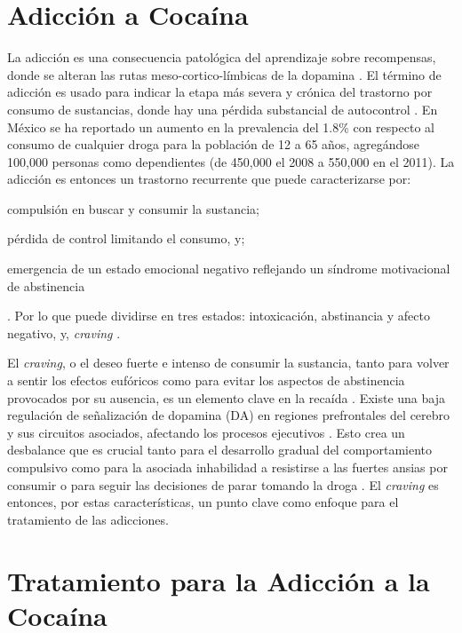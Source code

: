 \section{Adicción a Cocaína}

La adicción es una consecuencia patológica del aprendizaje sobre recompensas, donde se alteran las rutas meso-cortico-límbicas de la dopamina \parencite{Volkow2016}.
El término de adicción es usado para indicar la etapa más severa y crónica del trastorno por consumo de sustancias, donde hay una pérdida substancial de autocontrol \parencite{Volkow2016}.
En México se ha reportado un aumento en la prevalencia del 1.8\% con respecto al consumo de cualquier droga para la población de 12 a 65 años, agregándose 100,000 personas como dependientes (de 450,000 el 2008 a 550,000 en el 2011)\parencite{InstitutoNacionaldePsiquiatriaRamondelaFuenteMuniz2012a}.
La adicción es entonces un trastorno recurrente que puede caracterizarse por:
\begin{enumerate*}
    \item{compulsión en buscar y consumir la sustancia; }
    \item{pérdida de control limitando el consumo, y; }
    \item{emergencia de un estado emocional negativo reflejando un síndrome motivacional de abstinencia}
\end{enumerate*}.
Por lo que puede dividirse en tres estados: intoxicación, abstinancia y afecto negativo, y, \textit{craving} \parencite{Koob2010a}.\par
El \textit{craving}, o el deseo fuerte e intenso de consumir la sustancia, tanto para volver a sentir los efectos eufóricos como para evitar los aspectos de abstinencia provocados por su ausencia, es un elemento clave en la recaída \parencite{Koob2010a}. Existe una baja regulación de señalización de dopamina (DA) en regiones prefrontales del cerebro y sus circuitos asociados, afectando los procesos ejecutivos \parencite{Goldstein2012a}. Esto crea un desbalance que es crucial tanto para el desarrollo gradual del comportamiento compulsivo como para la asociada inhabilidad a resistirse a las fuertes ansias por consumir o para seguir las decisiones de parar tomando la droga \parencite{Volkow2016}. El \textit{craving} es entonces, por estas características, un punto clave como enfoque para el tratamiento de las adicciones.

\section{Tratamiento para la Adicción a la Cocaína}

